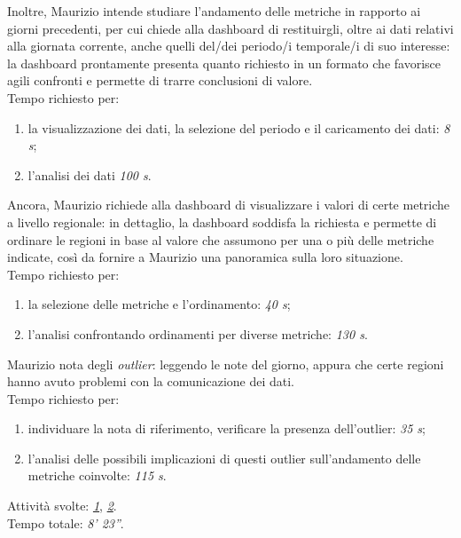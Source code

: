 \noindent
Inoltre, Maurizio intende studiare l'andamento delle metriche in rapporto ai giorni precedenti, per cui chiede alla dashboard di restituirgli, oltre ai dati relativi alla giornata corrente, anche quelli del/dei periodo/i temporale/i di suo interesse: la dashboard prontamente presenta quanto richiesto in un formato che favorisce agili confronti e permette di trarre conclusioni di valore.\\
Tempo richiesto per:
\begin{enumerate}
    \item la visualizzazione dei dati, la selezione del periodo e il caricamento dei dati: \textit{8 s};
    \item l'analisi dei dati \textit{100 s}.
\end{enumerate}

\noindent
Ancora, Maurizio richiede alla dashboard di visualizzare i valori di certe metriche a livello regionale: in dettaglio, la dashboard soddisfa la richiesta e permette di ordinare le regioni in base al valore che assumono per una o più delle metriche indicate, così da fornire a Maurizio una panoramica sulla loro situazione.\\
Tempo richiesto per:
\begin{enumerate}
    \item la selezione delle metriche e l'ordinamento: \textit{40 s};
    \item l'analisi confrontando ordinamenti per diverse metriche: \textit{130 s}.
\end{enumerate}

\noindent
Maurizio nota degli \textit{outlier}:  leggendo le note del giorno, appura che certe regioni hanno avuto problemi con la comunicazione dei dati.\\
Tempo richiesto per:
\begin{enumerate}
    \item individuare la nota di riferimento, verificare la presenza dell'outlier: \textit{35 s};
    \item l'analisi delle possibili implicazioni di questi outlier sull'andamento delle metriche coinvolte: \textit{115 s}.
\end{enumerate}

\noindent
Attività svolte: \hyperref[itm:1]{\textit{1}}, \hyperref[itm:2]{\textit{2}}.\\ 
Tempo totale: \textit{8' 23''}. 

